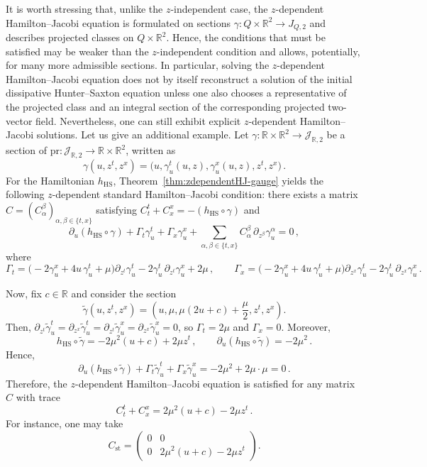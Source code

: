 \documentclass[11pt,twoside]{article}
\theoremstyle{plain}
\theoremstyle{definition}
\theoremstyle{remark}
\begin{document}
It is worth stressing that, unlike the $z$-independent case, the $z$-dependent Hamilton--Jacobi equation is formulated on sections $\gamma\colon Q\times\mathbb{R}^2\to J_{Q,2}$ and describes projected classes on $Q\times\mathbb{R}^2$. Hence, the conditions that must be satisfied may be weaker than the $z$-independent condition and allows, potentially, for many more admissible sections. In particular, solving the $z$-dependent Hamilton--Jacobi equation does not by itself reconstruct a solution of the initial dissipative Hunter--Saxton equation unless one also chooses a representative of the projected class and an integral section of the corresponding projected two-vector field.  Nevertheless, one can still exhibit explicit $z$-dependent Hamilton--Jacobi solutions. Let us give an additional example. 
Let $\gamma\colon\mathbb{R}\times\mathbb{R}^2\to \mathcal{J}_{\mathbb{R},2}$ be a section of $\mathrm{pr}\colon \mathcal{J}_{\mathbb{R},2}\to \mathbb{R}\times\mathbb{R}^2$, written as
\[
\gamma(u,z^t,z^x)=\bigl(u,\gamma_u^t(u,z),\gamma_u^x(u,z),z^t,z^x\bigr)\,.
\]
For the Hamiltonian
\(
h_{\mathrm{HS}}
\), 
Theorem~\ref{thm:zdependentHJ-gauge} yields the following $z$-dependent standard Hamilton--Jacobi condition: there exists a matrix $C=(C^\beta_\alpha)_{\alpha,\beta\in\{t,x\}}$ satisfying $C_t^t+C_x^x=-(h_{\mathrm{HS}}\circ\gamma)$ and
\[
\partial_u(h_{\mathrm{HS}}\circ\gamma)+\Gamma_t\gamma_u^t+\Gamma_x\gamma_u^x+\sum_{\alpha,\beta\in\{t,x\}}C^\beta_\alpha\,\partial_{z^\beta}\gamma_u^\alpha=0\,,
\]
where
\[
\Gamma_t=\bigl(-2\gamma_u^x+4u\,\gamma_u^t+\mu\bigr)\partial_{z^t}\gamma_u^t-2\gamma_u^t\,\partial_{z^t}\gamma_u^x+2\mu\,,\qquad 
\Gamma_x=\bigl(-2\gamma_u^x+4u\,\gamma_u^t+\mu\bigr)\partial_{z^x}\gamma_u^t-2\gamma_u^t\,\partial_{z^x}\gamma_u^x\,.
\]

Now, fix $c\in\mathbb{R}$ and consider the section
\[
\widetilde{\gamma}(u,z^t,z^x)=\left(u,\mu,\mu(2u+c)+\frac{\mu}{2},z^t,z^x\right).
\]
Then, $\partial_{z^t}\widetilde{\gamma}_u^t=\partial_{z^x}\widetilde{\gamma}_u^t=\partial_{z^t}\widetilde{\gamma}_u^x=\partial_{z^x}\widetilde{\gamma}_u^x=0$, so $\Gamma_t=2\mu$ and $\Gamma_x=0$. Moreover,
\[
h_{\mathrm{HS}}\circ\widetilde{\gamma}=-2\mu^2(u+c)+2\mu z^t\,,
\qquad
\partial_u(h_{\mathrm{HS}}\circ\widetilde{\gamma})=-2\mu^2\,.
\]
Hence,
\[
\partial_u(h_{\mathrm{HS}}\circ\widetilde{\gamma})+\Gamma_t\widetilde{\gamma}_u^t+\Gamma_x\widetilde{\gamma}_u^x
=-2\mu^2+2\mu\cdot\mu=0\,.
\]
Therefore, the $z$-dependent Hamilton--Jacobi equation is satisfied for any matrix $C$ with trace
\[
C_t^t+C_x^x=2\mu^2(u+c)-2\mu z^t\,.
\]
For instance, one may take
\[
C_{\mathrm{st}}=
\begin{pmatrix}
0 & 0\\
0 & 2\mu^2(u+c)-2\mu z^t
\end{pmatrix}.
\]
\end{document}
